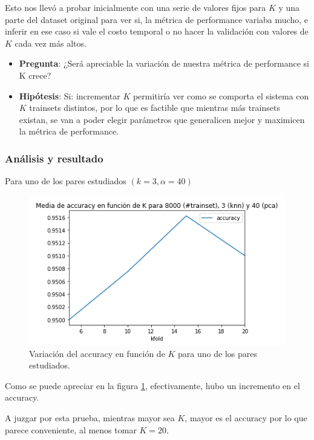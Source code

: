 Esto nos llevó a probar inicialmente con una serie de valores fijos para $K$ y una parte del dataset original para ver si, la métrica de performance variaba mucho, e inferir en ese caso si vale el costo temporal o no hacer la validación con valores de $K$ cada vez más altos.

\begin{itemize}
    \item \textbf{Pregunta}: ¿Será apreciable la variación de nuestra métrica de performance si K crece?
    \item \textbf{Hipótesis}: Si: incrementar $K$ permitiría ver como se comporta el sistema con $K$ trainsets distintos, por lo que es factible que mientras más trainsets existan, se van a poder elegir parámetros que generalicen mejor y maximicen la métrica de performance.
\end{itemize}

\subsubsection*{Análisis y resultado}

Para uno de los pares estudiados $(k = 3, \alpha = 40)$

\begin{figure}[H]
    \centering
    \includegraphics[scale=0.7]{images/KFoldIncreasingK.png}
    \caption{Variación del accuracy en función de $K$ para uno de los pares estudiados.}
    \label{fig:KFoldIncreasingK}
\end{figure}

Como se puede apreciar en la figura \ref{fig:KFoldIncreasingK}, efectivamente, hubo un incremento en el accuracy.

A juzgar por esta prueba, mientras mayor sea $K$, mayor es el accuracy por lo que parece conveniente, al menos tomar $K = 20$.

